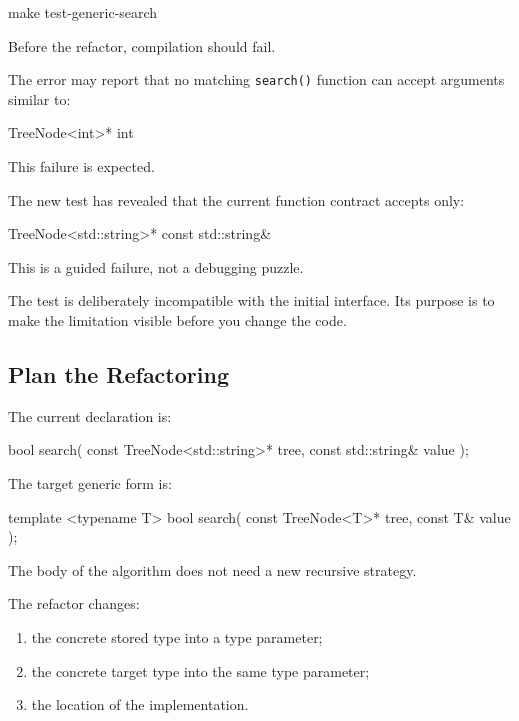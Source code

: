 \documentclass{csc2059practical}
\begin{document}
\begin{terminal}
make test-generic-search
\end{terminal}

Before the refactor, compilation should fail.

The error may report that no matching \texttt{search()} function can
accept arguments similar to:

\begin{cppcode}
TreeNode<int>*
int
\end{cppcode}

This failure is expected.

The new test has revealed that the current function contract accepts only:

\begin{cppcode}
TreeNode<std::string>*
const std::string&
\end{cppcode}

\begin{importantnote}
This is a guided failure, not a debugging puzzle.

The test is deliberately incompatible with the initial interface. Its purpose
is to make the limitation visible before you change the code.
\end{importantnote}

\subsection{Plan the Refactoring}

The current declaration is:

\begin{cppcode}
bool search(
    const TreeNode<std::string>* tree,
    const std::string& value
);
\end{cppcode}

The target generic form is:

\begin{cppcode}
template <typename T>
bool search(
    const TreeNode<T>* tree,
    const T& value
);
\end{cppcode}

The body of the algorithm does not need a new recursive strategy.

The refactor changes:

\begin{enumerate}
    \item the concrete stored type into a type parameter;
    \item the concrete target type into the same type parameter;
    \item the location of the implementation.
\end{enumerate}
\end{document}
